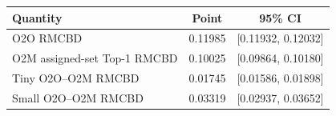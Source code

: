 \begin{tabular}{lcc}
\toprule
Quantity & Point & 95\% CI \\
\midrule
O2O RMCBD & 0.11985 & [0.11932, 0.12032] \\
O2M assigned-set Top-1 RMCBD & 0.10025 & [0.09864, 0.10180] \\
Tiny O2O--O2M RMCBD & 0.01745 & [0.01586, 0.01898] \\
Small O2O--O2M RMCBD & 0.03319 & [0.02937, 0.03652] \\
\bottomrule
\end{tabular}

